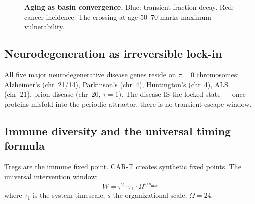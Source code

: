 \documentclass[11pt,a4paper]{article}
\begin{document}
\begin{figure}[h]
\centering
{}
\caption{\textbf{Aging as basin convergence.} Blue: transient fraction decay. Red: cancer incidence. The crossing at age 50--70 marks maximum vulnerability.}
\label{fig:aging}
\end{figure}

\subsection{Neurodegeneration as irreversible lock-in}

All five major neurodegenerative disease genes reside on $\tau = 0$ chromosomes: Alzheimer's (chr~21/14), Parkinson's (chr~4), Huntington's (chr~4), ALS (chr~21), prion disease (chr~20, $\tau = 1$). The disease IS the locked state --- once proteins misfold into the periodic attractor, there is no transient escape window.

\subsection{Immune diversity and the universal timing formula}

Tregs are the immune fixed point. CAR-T creates synthetic fixed points. The universal intervention window:
\begin{equation}
\boxed{W = \tau^2 \cdot \tau_1 \cdot \Omega^{s/s_{\max}}}
\end{equation}
where $\tau_1$ is the system timescale, $s$ the organizational scale, $\Omega = 24$.
\end{document}
